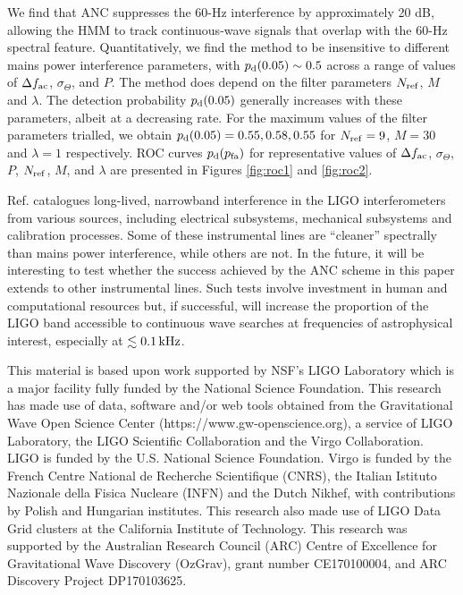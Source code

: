 \documentclass[pra,superscriptaddress,reprint,amsmath,amssymb,nofootinbib]{revtex4-2}
\begin{document}
We find that ANC suppresses the 60-Hz interference by approximately 20 dB, allowing the HMM to track continuous-wave signals that overlap with the 60-Hz spectral feature. Quantitatively, we find the method to be insensitive to different mains power interference parameters, with $p_{\rm d}(0.05) \sim 0.5$ across a range of values of $\Delta f_{\rm ac}$, $\sigma_\Theta$, and $P$. The method does depend on the filter parameters $N_{\rm ref}$, $M$ and $\lambda$. The detection probability $p_{\rm d}(0.05)$ generally increases with these parameters, albeit at a decreasing rate. For the maximum values of the filter parameters trialled, we obtain $p_{\rm d}(0.05) = 0.55, 0.58,0.55$ for $N_{\rm ref} = 9$, $M=30$ and $\lambda=1$ respectively. ROC curves $p_{\rm d}(p_{\rm fa})$ for representative values of $\Delta f_{\rm ac}$, $\sigma_\Theta$, $P$, $N_{\rm ref}$, $M$, and $\lambda$ are presented in Figures \ref{fig:roc1} and \ref{fig:roc2}. \newline 

Ref. \cite{CovasEtAl:2018} catalogues long-lived, narrowband interference in the LIGO interferometers from various sources, including electrical subsystems, mechanical subsystems and calibration processes. Some of these instrumental lines are ``cleaner'' spectrally than mains power interference, while others are not. In the future, it will be interesting to test whether the success achieved by the ANC scheme in this paper extends to other instrumental lines. Such tests involve investment in human and computational resources but, if successful, will increase the proportion of the LIGO band accessible to continuous wave searches at frequencies of astrophysical interest, especially at $\lesssim 0.1 \, {\rm kHz}$.



%




\begin{acknowledgements}
This material is based upon work supported by NSF's LIGO Laboratory which is a major facility fully funded by the National Science Foundation. This research has made use of data, software and/or web tools obtained from the Gravitational Wave Open Science Center (https://www.gw-openscience.org), a service of LIGO Laboratory, the LIGO Scientific Collaboration and the Virgo Collaboration. LIGO is funded by the U.S. National Science Foundation. Virgo is funded by the French Centre National de Recherche Scientifique (CNRS), the Italian Istituto Nazionale della Fisica Nucleare (INFN) and the Dutch Nikhef, with contributions by Polish and Hungarian institutes. This research also
made use of LIGO Data Grid clusters at the California Institute of Technology. This research was supported by
the Australian Research Council (ARC) Centre of Excellence for Gravitational Wave Discovery (OzGrav), grant number CE170100004, and ARC Discovery Project DP170103625.
\end{acknowledgements}
\end{document}
